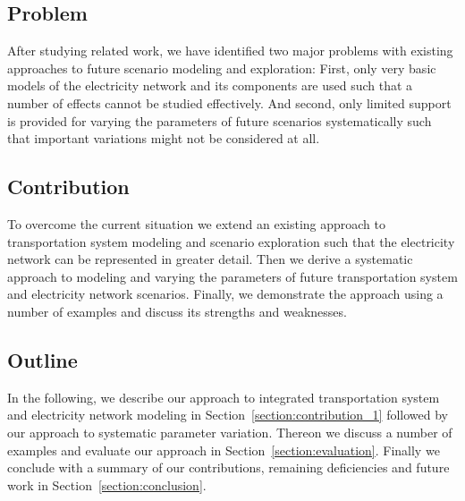 \subsection{Problem}

After studying related work, we have identified two major problems with existing approaches to future scenario modeling and exploration: First, only very basic models of the electricity network and its components are used such that a number of effects cannot be studied effectively. And second, only limited support is provided for varying the parameters of future scenarios systematically such that important variations might not be considered at all.

\subsection{Contribution}

To overcome the current situation we extend an existing approach to transportation system modeling and scenario exploration such that the electricity network can be represented in greater detail. Then we derive a systematic approach to modeling and varying the parameters of future transportation system and electricity network scenarios. Finally, we demonstrate the approach using a number of examples and discuss its strengths and weaknesses.



\subsection{Outline}

In the following, we describe our approach to integrated transportation system and electricity network modeling in Section~\ref{section:contribution_1} followed by our approach to systematic parameter variation. Thereon we discuss a number of examples and evaluate our approach in Section~\ref{section:evaluation}. Finally we conclude with a summary of our contributions, remaining deficiencies and future work in Section~\ref{section:conclusion}.